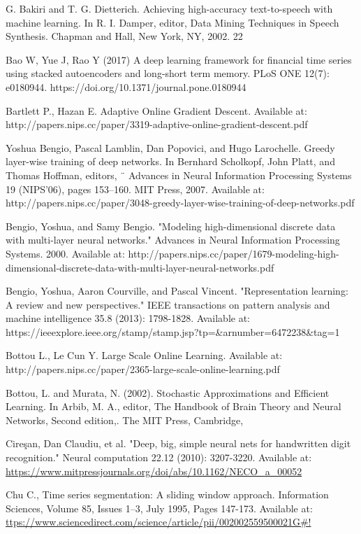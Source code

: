 \documentclass[a4paper,latin]{paper}
\begin{document}
\begin{thebibliography}{9}
G. Bakiri and T. G. Dietterich. Achieving high-accuracy text-to-speech with machine learning. In R. I. Damper, editor, Data Mining Techniques in Speech Synthesis. Chapman and Hall, New York, NY, 2002. 22

Bao W, Yue J, Rao Y (2017) A deep learning framework for financial time series using stacked autoencoders and long-short term memory. PLoS ONE 12(7): e0180944. https://doi.org/10.1371/journal.pone.0180944

Bartlett P., Hazan E. Adaptive Online Gradient Descent. Available at: http://papers.nips.cc/paper/3319-adaptive-online-gradient-descent.pdf

Yoshua Bengio, Pascal Lamblin, Dan Popovici, and Hugo Larochelle. Greedy layer-wise training of deep networks. In Bernhard Scholkopf, John Platt, and Thomas Hoffman, editors, ¨ Advances in Neural Information Processing Systems 19 (NIPS’06), pages 153–160. MIT Press, 
2007. Available at: http://papers.nips.cc/paper/3048-greedy-layer-wise-training-of-deep-networks.pdf

Bengio, Yoshua, and Samy Bengio. "Modeling high-dimensional discrete data with multi-layer neural networks." Advances in Neural Information Processing Systems. 2000.
Available at: http://papers.nips.cc/paper/1679-modeling-high-dimensional-discrete-data-with-multi-layer-neural-networks.pdf

Bengio, Yoshua, Aaron Courville, and Pascal Vincent. "Representation learning: A review and new perspectives." IEEE transactions on pattern analysis and machine intelligence 35.8 (2013): 1798-1828.
Available at: https://ieeexplore.ieee.org/stamp/stamp.jsp?tp=\&arnumber=6472238\&tag=1

Bottou L., Le Cun Y. Large Scale Online Learning. Available at: http://papers.nips.cc/paper/2365-large-scale-online-learning.pdf

Bottou, L. and Murata, N. (2002). Stochastic Approximations and Efficient Learning. In Arbib, M. A., editor, The Handbook of Brain Theory and Neural Networks, Second edition,. The MIT Press, Cambridge, 

Cireşan, Dan Claudiu, et al. "Deep, big, simple neural nets for handwritten digit recognition." Neural computation 22.12 (2010): 3207-3220.
Available at: \url{https://www.mitpressjournals.org/doi/abs/10.1162/NECO_a_00052}

Chu C., Time series segmentation: A sliding window approach. Information Sciences, Volume 85, Issues 1–3, July 1995, Pages 
147-173. Available at: \url{ttps://www.sciencedirect.com/science/article/pii/002002559500021G#!}


\end{thebibliography}
\end{document}
